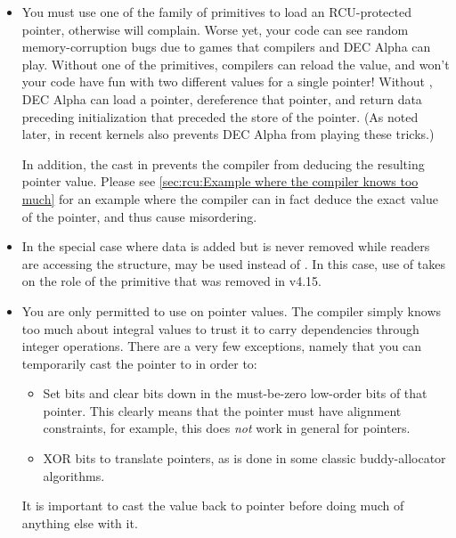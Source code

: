 \begin{itemize}
\item	You must use one of the  family of primitives
	to load an RCU-protected pointer, otherwise 
	will complain.
	Worse yet, your code can see random memory-corruption
	bugs due to games that compilers and DEC Alpha can play.
	Without one of the  primitives, compilers
	can reload the value, and won't your code have fun with two
	different values for a single pointer!
	Without ,
	DEC Alpha can load a pointer, dereference that pointer, and
	return data preceding initialization that preceded the store
	of the pointer.
	(As noted later, in recent kernels 
	also prevents DEC Alpha from playing these tricks.)

	In addition, the  cast in  prevents the
	compiler from deducing the resulting pointer value.
	Please see \cref{sec:rcu:Example where the compiler knows too much}
	for an example where the compiler can in fact deduce the exact
	value of the pointer, and thus cause misordering.

\item	In the special case where data is added but is never removed
	while readers are accessing the structure,  may be used
	instead of .
	In this case, use of 
	takes on the role of the  primitive that
	was removed in v4.15.

\item	You are only permitted to use  on pointer values.
	The compiler simply knows too much about integral values to
	trust it to carry dependencies through integer operations.
	There are a very few exceptions, namely that you can temporarily
	cast the pointer to  in order to:

	\begin{itemize}
	\item	Set bits and clear bits down in the must-be-zero low-order
		bits of that pointer.
		This clearly means that the pointer
		must have alignment constraints, for example, this does
		\emph{not} work in general for  pointers.

	\item	XOR bits to translate pointers, as is done in some
		classic buddy-allocator algorithms.
	\end{itemize}

	It is important to cast the value back to pointer before
	doing much of anything else with it.


\end{itemize}
